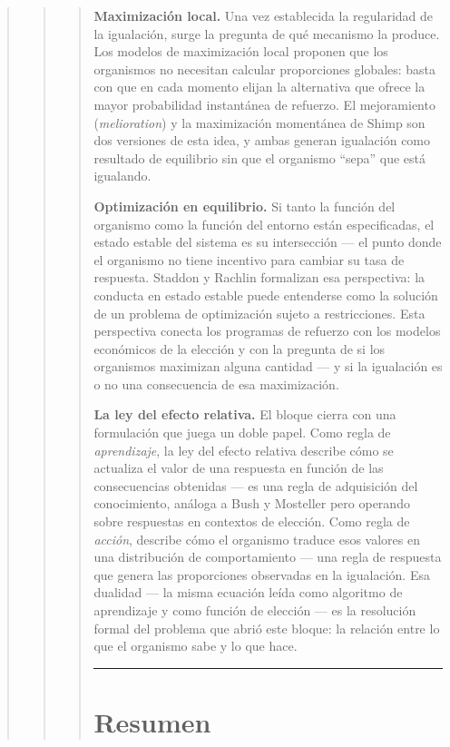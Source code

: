\documentclass[
  letterpaper,
  DIV=11,
  numbers=noendperiod]{scrreprt}
\begin{document}
\begin{tcolorbox}[enhanced jigsaw, toprule=.15mm, arc=.35mm, colback=white, opacityback=0, colframe=quarto-callout-note-color-frame, breakable, rightrule=.15mm, left=2mm, leftrule=.75mm, bottomrule=.15mm]
\begin{quote}
\begin{quote}
\begin{quote}
\textbf{Maximización local.} Una vez establecida la regularidad de la
igualación, surge la pregunta de qué mecanismo la produce. Los modelos
de maximización local proponen que los organismos no necesitan calcular
proporciones globales: basta con que en cada momento elijan la
alternativa que ofrece la mayor probabilidad instantánea de refuerzo. El
mejoramiento (\emph{melioration}) y la maximización momentánea de Shimp
son dos versiones de esta idea, y ambas generan igualación como
resultado de equilibrio sin que el organismo ``sepa'' que está
igualando.

\textbf{Optimización en equilibrio.} Si tanto la función del organismo
como la función del entorno están especificadas, el estado estable del
sistema es su intersección --- el punto donde el organismo no tiene
incentivo para cambiar su tasa de respuesta. Staddon y Rachlin
formalizan esa perspectiva: la conducta en estado estable puede
entenderse como la solución de un problema de optimización sujeto a
restricciones. Esta perspectiva conecta los programas de refuerzo con
los modelos económicos de la elección y con la pregunta de si los
organismos maximizan alguna cantidad --- y si la igualación es o no una
consecuencia de esa maximización.

\textbf{La ley del efecto relativa.} El bloque cierra con una
formulación que juega un doble papel. Como regla de \emph{aprendizaje},
la ley del efecto relativa describe cómo se actualiza el valor de una
respuesta en función de las consecuencias obtenidas --- es una regla de
adquisición del conocimiento, análoga a Bush y Mosteller pero operando
sobre respuestas en contextos de elección. Como regla de \emph{acción},
describe cómo el organismo traduce esos valores en una distribución de
comportamiento --- una regla de respuesta que genera las proporciones
observadas en la igualación. Esa dualidad --- la misma ecuación leída
como algoritmo de aprendizaje y como función de elección --- es la
resolución formal del problema que abrió este bloque: la relación entre
lo que el organismo sabe y lo que hace.

\begin{center}\rule{0.5\linewidth}{0.5pt}\end{center}

\section{Resumen}\label{resumen-7}


\end{quote}
\end{quote}
\end{quote}
\end{tcolorbox}
\end{document}
